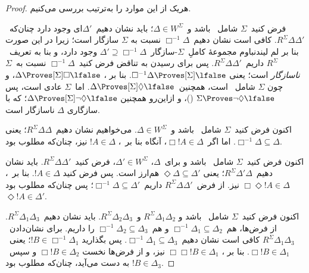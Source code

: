 \documentclass[../../../include/open-logic-section]{subfiles}
\begin{document}
\begin{proof}
  هریک از این موارد را به‌ترتیب بررسی می‌کنیم.

  فرض کنید~$\Sigma$ شامل~ باشد و~$\Delta \in W^\Sigma$؛ باید
  نشان دهیم~$\Delta'$ای وجود دارد چنان‌که~$R^\Sigma
  \Delta\Delta'$. کافی است نشان دهیم~$\Box^{-1}\Delta$ نسبت به
  $\Sigma$ سازگار است؛ زیرا در این صورت بنا بر لم لیندنباوم مجموعهٔ
  کاملِ~$\Sigma$-سازگار~$\Delta' \supseteq \Box^{-1}\Delta$ وجود
  دارد، و بنا به تعریف~$R^\Sigma$ داریم~$R^\Sigma
  \Delta\Delta'$. پس برای رسیدن به تناقض فرض کنید~$\Box^{-1}\Delta$
  نسبت به~$\Sigma$ \emph{ناسازگار} است؛ یعنی
  $\Box^{-1}\Delta \Proves[\Sigma] \lfalse$. بنا بر
  ، $\Delta \Proves[\Sigma] \Box\lfalse$، و چون
  $\Sigma$ شامل~ است، همچنین~$\Delta \Proves[\Sigma]
  \Diamond\lfalse$. اما~$\Sigma$ عادی است، پس
  $\Sigma \Proves \lnot\Diamond \lfalse$
  ()، و ازاین‌رو همچنین
  $\Delta \Proves[\Sigma] \lnot\Diamond \lfalse$؛ که با سازگاری
  $\Delta$ ناسازگار است.

  اکنون فرض کنید~$\Sigma$ شامل~ باشد و~$\Delta \in
  W^\Sigma$. می‌خواهیم نشان دهیم~$R^\Sigma \Delta\Delta$؛ یعنی
  $\Box^{-1}\Delta \subseteq \Delta$. اما اگر~$\Box!A \in \Delta$،
  آنگاه بنا بر~، $!A \in \Delta$ نیز، چنان‌که مطلوب بود.

  اکنون فرض کنید~$\Sigma$ شامل~ باشد و برای~$\Delta$،
  $\Delta' \in W^\Sigma$، فرض کنید~$R^\Sigma \Delta\Delta'$. باید
  نشان دهیم~$R^\Sigma \Delta'\Delta$؛ یعنی 
  $\Diamond\Delta \subseteq \Delta'$ هم‌ارز است. پس فرض کنید
  $!A \in \Delta$. بنا بر~، $\Box\Diamond!A \in \Delta$ نیز.
  از فرض~$R^\Sigma \Delta\Delta'$ داریم~$\Box^{-1}\Delta
  \subseteq \Delta'$؛ پس چنان‌که مطلوب بود~$\Diamond!A \in
  \Delta'$.

  اکنون فرض کنید~$\Sigma$ شامل~ باشد و
  $R^\Sigma \Delta_1\Delta_2$ و~$R^\Sigma \Delta_2\Delta_3$. باید
  نشان دهیم~$R^\Sigma \Delta_1\Delta_3$. از فرض‌ها، هم~$\Box^{-1}\Delta_1
  \subseteq \Delta_2$ و هم~$\Box^{-1}\Delta_2 \subseteq \Delta_3$
  را داریم. برای نشان‌دادن~$R^\Sigma \Delta_1\Delta_3$ کافی است نشان
  دهیم~$\Box^{-1}\Delta_1 \subseteq \Delta_3$. پس بگذارید
  $!B \in \Box^{-1}\Delta_1$؛ یعنی~$\Box!B \in \Delta_1$. بنا بر
  ، $\Box\Box!B \in \Delta_1$ نیز، و از فرض‌ها نخست
  $\Box!B \in \Delta_2$ و سپس~$!B \in \Delta_3$ به دست می‌آید،
  چنان‌که مطلوب بود.


\end{proof}
\end{document}
